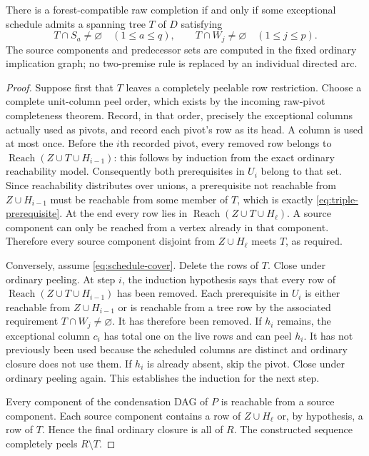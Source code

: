 \begin{theorem}\label{thm:exact-schedule}
There is a forest-compatible raw completion if and only if some exceptional
schedule admits a spanning tree $T$ of $D$ satisfying
\begin{equation}\label{eq:schedule-cover}
        T\cap S_a\ne\varnothing\quad(1\leq a\leq q),\qquad
        T\cap W_j\ne\varnothing\quad(1\leq j\leq p).
\end{equation}
The source components and predecessor sets are computed in the fixed
ordinary implication graph; no two-premise rule is replaced by an
individual directed arc.
\end{theorem}
\begin{proof}
Suppose first that $T$ leaves a completely peelable row restriction.
Choose a complete unit-column peel order, which exists by the incoming
raw-pivot completeness theorem.  Record, in that order, precisely the
exceptional columns actually used as pivots, and record each pivot's row
as its head.  A column is used at most once.  Before the $i$th recorded
pivot, every removed row belongs to
$\operatorname{Reach}(Z\cup T\cup H_{i-1})$: this follows by induction
from the exact ordinary reachability model.  Consequently both prerequisites
in $U_i$ belong to that set.  Since reachability distributes over unions,
a prerequisite not reachable from $Z\cup H_{i-1}$ must be reachable from
some member of $T$, which is exactly \eqref{eq:triple-prerequisite}.
At the end every row lies in
$\operatorname{Reach}(Z\cup T\cup H_\ell)$.  A source component can only
be reached from a vertex already in that component.  Therefore every source
component disjoint from $Z\cup H_\ell$ meets $T$, as required.

Conversely, assume \eqref{eq:schedule-cover}.  Delete the rows of $T$.
Close under ordinary peeling.  At step $i$, the induction hypothesis says
that every row of $\operatorname{Reach}(Z\cup T\cup H_{i-1})$ has been
removed.  Each prerequisite in $U_i$ is either reachable from
$Z\cup H_{i-1}$ or is reachable from a tree row by the associated
requirement $T\cap W_j\ne\varnothing$.  It has therefore been removed.
If $h_i$ remains, the exceptional column $c_i$ has total one on the live
rows and can peel $h_i$.  It has not previously been used because the
scheduled columns are distinct and ordinary closure does not use them.
If $h_i$ is already absent, skip the pivot.  Close under ordinary peeling
again.  This establishes the induction for the next step.

Every component of the condensation DAG of $P$ is reachable from a source
component.  Each source component contains a row of $Z\cup H_\ell$ or,
by hypothesis, a row of $T$.  Hence the final ordinary closure is all of
$R$.  The constructed sequence completely peels $R\setminus T$.
\end{proof}

